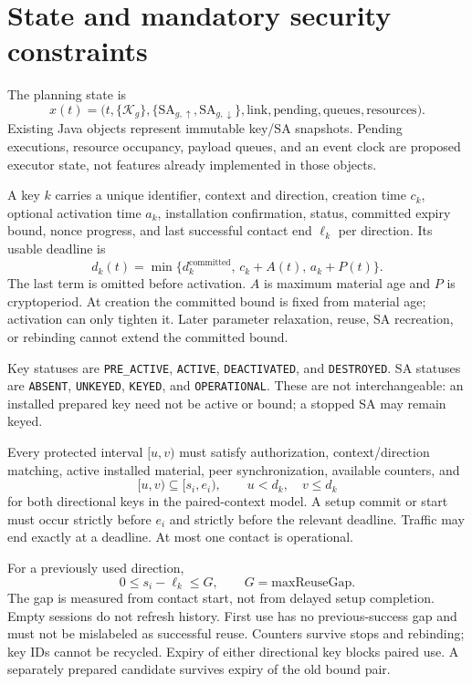 \documentclass[11pt,a4paper]{article}
\newcommand{\act}[1]{\texttt{#1}}
\begin{document}
\section{State and mandatory security constraints}
The planning state is
\[
 x(t)=\bigl(t,\{\mathcal K_g\},\{\mathrm{SA}_{g,\uparrow},\mathrm{SA}_{g,\downarrow}\},
          \mathrm{link},\mathrm{pending},\mathrm{queues},\mathrm{resources}\bigr).
\]
Existing Java objects represent immutable key/SA snapshots. Pending executions, resource occupancy, payload queues, and an event clock are proposed executor state, not features already implemented in those objects.

A key $k$ carries a unique identifier, context and direction, creation time $c_k$, optional activation time $a_k$, installation confirmation, status, committed expiry bound, nonce progress, and last successful contact end $\ell_k$ per direction. Its usable deadline is
\[
 d_k(t)=\min\{d_k^{\mathrm{committed}},\,c_k+A(t),\,a_k+P(t)\}.
\]
The last term is omitted before activation. $A$ is maximum material age and $P$ is cryptoperiod. At creation the committed bound is fixed from material age; activation can only tighten it. Later parameter relaxation, reuse, SA recreation, or rebinding cannot extend the committed bound.

Key statuses are \act{PRE\_ACTIVE}, \act{ACTIVE}, \act{DEACTIVATED}, and \act{DESTROYED}. SA statuses are \act{ABSENT}, \act{UNKEYED}, \act{KEYED}, and \act{OPERATIONAL}. These are not interchangeable: an installed prepared key need not be active or bound; a stopped SA may remain keyed.

Every protected interval $[u,v)$ must satisfy authorization, context/direction matching, active installed material, peer synchronization, available counters, and
\[
 [u,v)\subseteq[s_i,e_i),\qquad u<d_k,\quad v\leq d_k
\]
for both directional keys in the paired-context model. A setup commit or start must occur strictly before $e_i$ and strictly before the relevant deadline. Traffic may end exactly at a deadline. At most one contact is operational.

For a previously used direction,
\[
 0\leq s_i-\ell_k\leq G,\qquad G=\mathrm{maxReuseGap}.
\]
The gap is measured from contact start, not from delayed setup completion. Empty sessions do not refresh history. First use has no previous-success gap and must not be mislabeled as successful reuse. Counters survive stops and rebinding; key IDs cannot be recycled. Expiry of either directional key blocks paired use. A separately prepared candidate survives expiry of the old bound pair.
\end{document}

